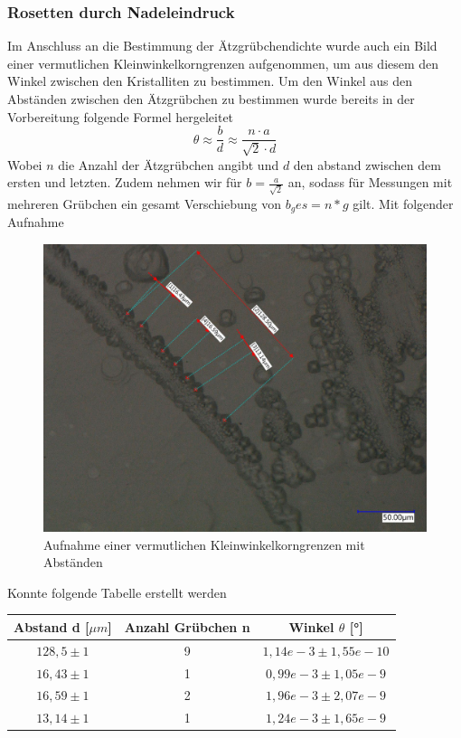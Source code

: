         \subsubsection*{Rosetten durch Nadeleindruck}
            Im Anschluss an die Bestimmung der Ätzgrübchendichte wurde auch ein Bild einer vermutlichen Kleinwinkelkorngrenzen aufgenommen, um aus diesem
            den Winkel zwischen den Kristalliten zu bestimmen. Um den Winkel aus den Abständen zwischen den Ätzgrübchen zu bestimmen wurde bereits in der Vorbereitung
            folgende Formel hergeleitet
            \begin{equation}
                \theta \approx \frac{b}{d} \approx \frac{n\cdot a}{\sqrt{2}\cdot d}
            \end{equation}
            Wobei $n$ die Anzahl der Ätzgrübchen angibt und $d$ den abstand zwischen dem ersten und letzten. Zudem nehmen wir für $b=\frac{a}{\sqrt{2}}$ an, sodass für
            Messungen mit mehreren Grübchen ein gesamt Verschiebung von $b_ges = n * g$ gilt.
            Mit folgender Aufnahme
            \begin{figure}[H]
                \centering
                \includegraphics[width=\textwidth]{Images/kleinwinkelkorngrenze 2.jpg}
                \caption{Aufnahme einer vermutlichen Kleinwinkelkorngrenzen mit Abständen}
            \end{figure}
            Konnte folgende Tabelle erstellt werden
            \begin{table}[H]
                \centering
                \begin{tabular}[]{c|c|c}
                    Abstand d [$\mu m$] & Anzahl Grübchen n & Winkel $\theta$ [°] \\
                    \hline
                    $128,5 \pm 1$ & 9 & $1,14e-3 \pm 1,55e-10$\\
                    $16,43 \pm 1$ & 1 & $0,99e-3 \pm 1,05e-9$\\
                    $16,59 \pm 1$ & 2 & $1,96e-3 \pm 2,07e-9$\\
                    $13,14 \pm 1$ & 1 & $1,24e-3 \pm 1,65e-9$\\   
                \end{tabular}
            \end{table}
